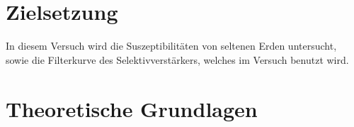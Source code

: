 \section{Zielsetzung}
In diesem Versuch wird die Suszeptibilitäten von seltenen Erden untersucht, sowie die Filterkurve des Selektivverstärkers, welches im Versuch benutzt wird.

\section{Theoretische Grundlagen}





